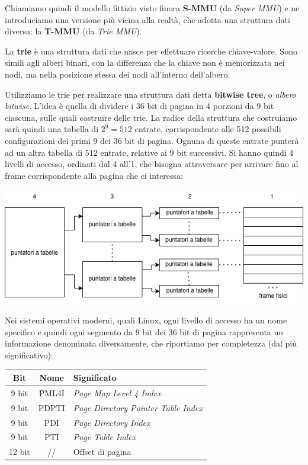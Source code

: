 \documentclass[a4paper,11pt]{article}
\begin{document}
Chiamiamo quindi il modello fittizio visto finora \textbf{S-MMU} (da \textit{Super MMU}) e ne introduciamo una versione più vicina alla realtà, che adotta una struttura dati diversa: la \textbf{T-MMU} (da \textit{Trie MMU}).

La \textbf{trie} è una struttura dati che nasce per effettuare ricerche chiave-valore.
Sono simili agli alberi binari, con la differenza che la chiave non è memorizzata nei nodi, ma nella posizione stessa dei nodi all'interno dell'albero.

Utilizziamo le trie per realizzare una struttura dati detta \textbf{bitwise tree}, o \textit{albero bitwise}.
L'idea è quella di dividere i 36 bit di pagina in 4 porzioni da 9 bit ciascuna, sulle quali costruire delle trie.
La radice della struttura che costruiamo sarà quindi una tabella di $2^9 = 512$ entrate, corrispondente alle 512 possibili configurazioni dei primi 9 dei 36 bit di pagina.
Ognuna di queste entrate punterà ad un altra tabella di $512$ entrate, relative ai 9 bit successivi.
Si hanno quindi 4 livelli di accesso, ordinati dal 4 all'1, che bisogna attraversare per arrivare fino al frame corrispondente alla pagina che ci interessa:

\begin{center}
	\includegraphics[scale=0.6]{../figures/mmu_trie.png}
\end{center}

Nei sistemi operativi moderni, quali Linux, ogni livello di accesso ha un nome specifico e quindi ogni segmento da 9 bit dei 36 bit di pagina rappresenta un informazione denominata diversamente, che riportiamo per completezza (dal più significativo):

\begin{table}[h!]
	\center {}
	\begin{tabular} { c | c | p{7cm} }
		\bfseries Bit & \bfseries Nome & \bfseries Significato \\ 
		\hline
		9 bit & PML4I & \textit{Page Map Level 4 Index} \\
		9 bit & PDPTI & \textit{Page Directory Pointer Table Index} \\
		9 bit & PDI & \textit{Page Directory Index} \\
		9 bit & PTI & \textit{Page Table Index} \\
		12 bit & // & Offset di pagina 
	\end{tabular}
\end{table}
\end{document}
